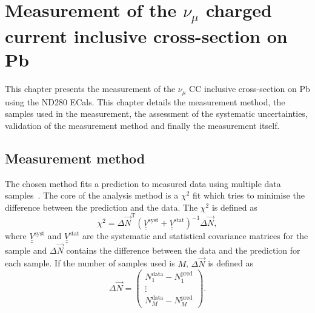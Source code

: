 \chapter{Measurement of the $\nu_\mu$ charged current inclusive cross-section on Pb}
\label{chap:CrossSectionMeasurement}
This chapter presents the measurement of the $\nu_\mu$ CC inclusive cross-section on Pb using the ND280 ECals.  This chapter details the measurement method, the samples used in the measurement, the assessment of the systematic uncertainties, validation of the measurement method and finally the measurement itself.

\section{Measurement method}
\label{sec:MeasurementMethod}
The chosen method fits a prediction to measured data using multiple data samples~\cite{PhysRevD.78.032003, PhysRevD.83.012005}.   The core of the analysis method is a $\chi^2$ fit which tries to minimise the difference between the prediction and the data.  The $\chi^2$ is defined as 
\begin{equation}
  \chi^2 = \Delta \vec{N}^{\textrm{T}} \left(\underline{\underline{V}}^{\textrm{syst}} + \underline{\underline{V}}^{\textrm{stat}} \right)^{-1} \Delta \vec{N},
  \label{eqn:Chi2Def}
\end{equation}
where $\underline{\underline{V}}^{\textrm{syst}}$ and $\underline{\underline{V}}^{\textrm{stat}}$ are the systematic and statistical covariance matrices for the sample and $\Delta\vec{N}$ contains the difference between the data and the prediction for each sample.  If the number of samples used is $M$, $\Delta\vec{N}$ is defined as 
\begin{equation}
  \Delta\vec{N} = 
  \begin{pmatrix}
    N^{\textrm{data}}_1 - N^{\textrm{pred}}_1 \\
    \vdots \\
    N^{\textrm{data}}_M - N^{\textrm{pred}}_M
  \end{pmatrix}.
  \label{eqn:VecNDef}
\end{equation}

